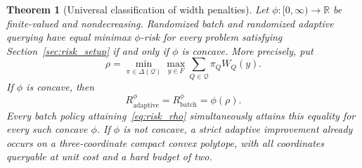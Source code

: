 \documentclass[12pt]{article}
\newtheorem{theorem}{Theorem}
\begin{document}
\begin{theorem}[Universal classification of width penalties]
\label{prop:risk_classification}
Let $\phi:[0,\infty)\to\mathbb R$ be finite-valued and nondecreasing.
Randomized batch and randomized adaptive querying have equal minimax
$\phi$-risk for every problem satisfying Section~\ref{sec:risk_setup}
if and only if $\phi$ is concave. More precisely, put
\begin{equation}
 \rho=\min_{\pi\in\Delta(\mathcal Q)}\max_{y\in F}
         \sum_{Q\in\mathcal Q}\pi_Q W_Q(y).
 \label{eq:risk_rho}
\end{equation}
If $\phi$ is concave, then
\begin{equation}
 R_{\mathrm{adaptive}}^{\phi}
 =R_{\mathrm{batch}}^{\phi}=\phi(\rho).
 \label{eq:risk_concave_value}
\end{equation}
Every batch policy attaining~\eqref{eq:risk_rho} simultaneously attains
this equality for every such concave $\phi$. If $\phi$ is not concave,
a strict adaptive improvement already occurs on a three-coordinate
compact convex polytope, with all coordinates queryable at unit cost
and a hard budget of two.
\end{theorem}
\end{document}
